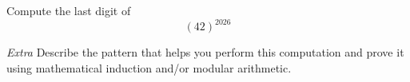 
Compute the last digit of 
\[
    (42)^{2026}
\]

\vfill

{\it Extra} Describe the pattern that helps you perform this computation 
and prove it using mathematical induction and/or modular arithmetic.